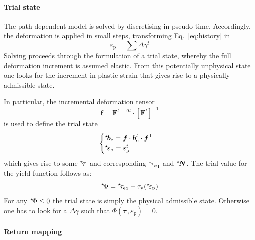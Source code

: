 \documentclass{goose-article}
\newcommand\ST[1]{\hspace*{-.3em}~^\star\!#1}
\newcommand\T[1]{\bm{{#1}}}
\begin{document}
\paragraph{Trial state}

The path-dependent model is solved by discretising in pseudo-time. Accordingly, the deformation is applied in small steps, transforming Eq.~\eqref{eq:history} in
\begin{equation}
  \varepsilon_\mathrm{p} = \sum \Delta \gamma^t
\end{equation}
Solving proceeds through the formulation of a trial state, whereby the full deformation increment is assumed elastic. From this potentially unphysical state one looks for the increment in plastic strain that gives rise to a physically admissible state.

In particular, the incremental deformation tensor
\begin{equation}
  \T{f} = \T{F}^{t + \Delta t} \cdot \left[ \T{F}^t \right]^{-1}
\end{equation}
is used to define the trial state
\begin{equation}
  \begin{cases}
    \ST{\T{b}}_\mathrm{e} = \T{f} \cdot \T{b}_\mathrm{e}^t \cdot \T{f}^\mathsf{T}
    \\
    \ST{\varepsilon_\mathrm{p}} = \varepsilon_\mathrm{p}^t
  \end{cases}
\end{equation}
which gives rise to some $\ST{\T{\tau}}$ and corresponding $\ST{\tau}_\mathrm{eq}$ and $\ST{\T{N}}$. The trial value for the yield function follows as:
\begin{equation}
  \ST{\Phi} = \ST{\tau}_\mathrm{eq} - \tau_\mathrm{y}(\ST{\varepsilon}_\mathrm{p})
\end{equation}
For any $\ST{\Phi} \leq 0$ the trial state is simply the physical admissible state. Otherwise one has to look for a $\Delta \gamma$ such that $\Phi(\T{\tau},\varepsilon_\mathrm{p}) = 0$.

\paragraph{Return mapping}
\end{document}
